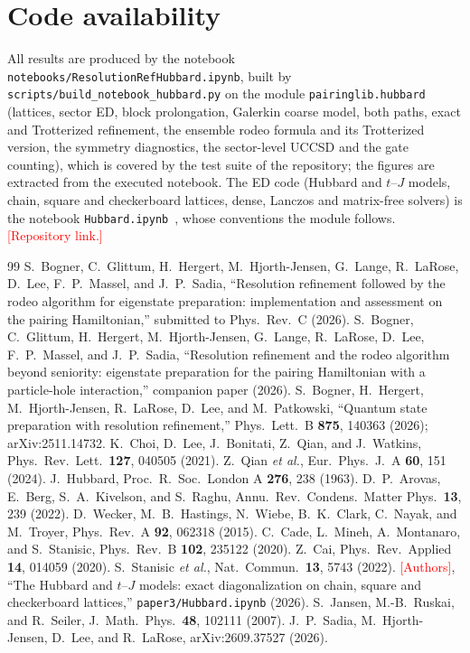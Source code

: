 \documentclass[
  aps,
  prc,
  reprint,
  superscriptaddress,
  floatfix,
  nofootinbib
]{revtex4-2}
\newcommand{\todo}[1]{\textcolor{red}{[#1]}}
\begin{document}
\section*{Code availability}
\label{sec:code}
All results are produced by the notebook
\texttt{notebooks/ResolutionRefHubbard.ipynb}, built by
\texttt{scripts/build\_notebook\_hubbard.py} on the module
\texttt{pairinglib.hubbard} (lattices, sector ED, block prolongation,
Galerkin coarse model, both paths, exact and Trotterized refinement, the
ensemble rodeo formula and its Trotterized version, the symmetry
diagnostics, the sector-level UCCSD and the gate counting), which is covered
by the test suite of the repository; the figures are extracted from the
executed notebook.  The ED code (Hubbard and $t$--$J$ models, chain, square
and checkerboard lattices, dense, Lanczos and matrix-free solvers) is the
notebook \texttt{Hubbard.ipynb}~\cite{HubbardNotebook}, whose conventions
the module follows.  \todo{Repository link.}

\begin{thebibliography}{99}
 S.~Bogner, C.~Glittum, H.~Hergert,
M.~Hjorth-Jensen, G.~Lange, R.~LaRose, D.~Lee, F.~P.~Massel, and J.~P.~Sadia,
``Resolution refinement followed by the rodeo algorithm for eigenstate
preparation: implementation and assessment on the pairing Hamiltonian,''
submitted to Phys.\ Rev.\ C (2026).
 S.~Bogner, C.~Glittum, H.~Hergert,
M.~Hjorth-Jensen, G.~Lange, R.~LaRose, D.~Lee, F.~P.~Massel, and J.~P.~Sadia,
``Resolution refinement and the rodeo algorithm beyond seniority:
eigenstate preparation for the pairing Hamiltonian with a particle-hole
interaction,'' companion paper (2026).
 S.~Bogner, H.~Hergert, M.~Hjorth-Jensen, R.~LaRose,
D.~Lee, and M.~Patkowski, ``Quantum state preparation with resolution
refinement,'' Phys.\ Lett.\ B \textbf{875}, 140363 (2026); arXiv:2511.14732.
 K.~Choi, D.~Lee, J.~Bonitati, Z.~Qian, and J.~Watkins,
Phys.\ Rev.\ Lett.\ \textbf{127}, 040505 (2021).
 Z.~Qian \emph{et al.}, Eur.\ Phys.\ J.\ A \textbf{60}, 151 (2024).
 J.~Hubbard, Proc.\ R.\ Soc.\ London A \textbf{276}, 238 (1963).
 D.~P.~Arovas, E.~Berg, S.~A.~Kivelson, and S.~Raghu,
Annu.\ Rev.\ Condens.\ Matter Phys.\ \textbf{13}, 239 (2022).
 D.~Wecker, M.~B.~Hastings, N.~Wiebe, B.~K.~Clark,
C.~Nayak, and M.~Troyer, Phys.\ Rev.\ A \textbf{92}, 062318 (2015).
 C.~Cade, L.~Mineh, A.~Montanaro, and S.~Stanisic,
Phys.\ Rev.\ B \textbf{102}, 235122 (2020).
 Z.~Cai, Phys.\ Rev.\ Applied \textbf{14}, 014059 (2020).
 S.~Stanisic \emph{et al.}, Nat.\ Commun.\ \textbf{13}, 5743 (2022).
 \todo{Authors}, ``The Hubbard and $t$--$J$ models:
exact diagonalization on chain, square and checkerboard lattices,''
\texttt{paper3/Hubbard.ipynb} (2026).
 S.~Jansen, M.-B.~Ruskai, and R.~Seiler, J.~Math.\ Phys.\
\textbf{48}, 102111 (2007).
 J.~P.~Sadia, M.~Hjorth-Jensen, D.~Lee, and R.~LaRose,
arXiv:2609.37527 (2026).
\end{thebibliography}
\end{document}
